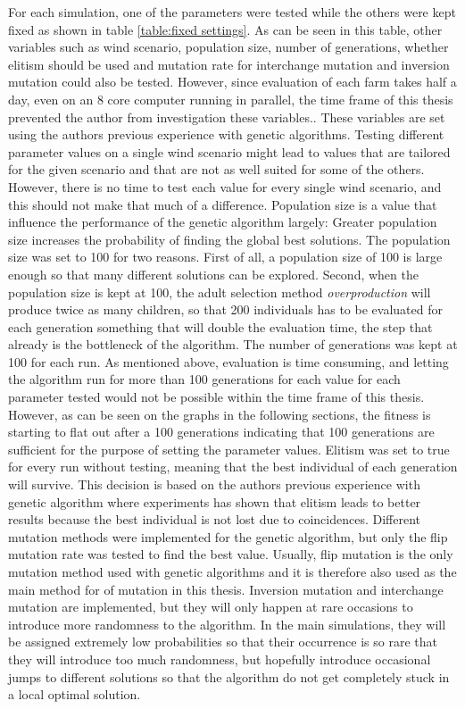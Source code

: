 \noindent For each simulation, one of the parameters were tested while the others were kept fixed as shown in table \ref{table:fixed settings}. As can be seen in this table, other variables such as wind scenario, population size, number of generations, whether elitism should be used and mutation rate for interchange mutation and inversion mutation could also be tested. However, since evaluation of each farm takes half a day, even on an 8 core computer running in parallel, the time frame of this thesis prevented the author from investigation these variables.. These variables are set using the authors previous experience with genetic algorithms. Testing different parameter values on a single wind scenario might lead to values that are tailored for the given scenario and that are not as well suited for some of the others. However, there is no time to test each value for every single wind scenario, and this should not make that much of a difference. Population size is a value that influence the performance of the genetic algorithm largely: Greater population size increases the probability of finding the global best solutions. The population size was set to 100 for two reasons. First of all, a population size of 100 is large enough so that many different solutions can be explored. Second, when the population size is kept at 100, the adult selection method \textit{overproduction} will produce twice as many children, so that 200 individuals has to be evaluated for each generation something that will double the evaluation time, the step that already is the bottleneck of the algorithm. The number of generations was kept at 100 for each run. As mentioned above, evaluation is time consuming, and letting the algorithm run for more than 100 generations for each value for each parameter tested would not be possible within the time frame of this thesis. However, as can be seen on the graphs in the following sections, the fitness is starting to flat out after a 100 generations indicating that 100 generations are sufficient for the purpose of setting the parameter values. Elitism was set to true for every run without testing, meaning that the best individual of each generation will survive. This decision is based on the authors previous experience with genetic algorithm where experiments has shown that elitism leads to better results because the best individual is not lost due to coincidences. Different mutation methods were implemented for the genetic algorithm, but only the flip mutation rate was tested to find the best value. Usually, flip mutation is the only mutation method used with genetic algorithms and it is therefore also used as the main method for of mutation in this thesis. Inversion mutation and interchange mutation are implemented, but they will only happen at rare occasions to introduce more randomness to the algorithm. In the main simulations, they will be assigned extremely low probabilities so that their occurrence is so rare that they will introduce too much randomness, but hopefully introduce occasional jumps to different solutions so that the algorithm do not get completely stuck in a local optimal solution. 


